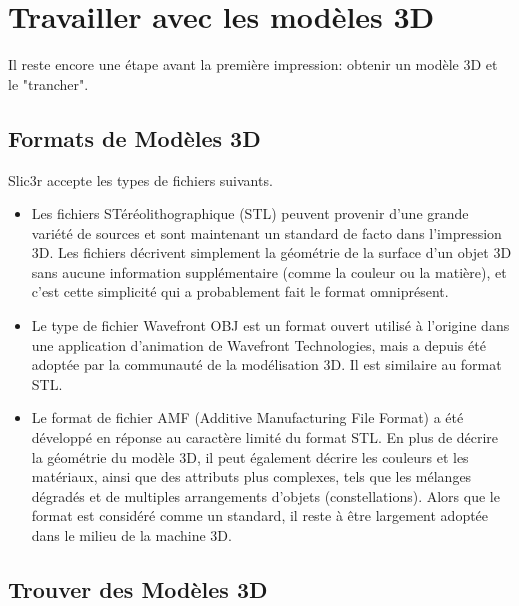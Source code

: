\section{Travailler avec les mod\`eles 3D}
\label{sub:working_with_models}

Il reste encore une \'etape avant la premi\`ere impression: obtenir un mod\`ele 3D et le "trancher".

\subsection{Formats de Mod\`eles 3D} %
\label{sub:model_formats}

Slic3r accepte les types de fichiers suivants.

\begin{itemize}
	\item Les fichiers ST\'er\'eolithographique (STL) peuvent provenir d'une grande vari\'et\'e de sources et sont maintenant un standard de facto dans l'impression 3D. Les fichiers d\'ecrivent simplement la g\'eom\'etrie de la surface d'un objet 3D sans aucune information suppl\'ementaire (comme la couleur ou la mati\`ere), et c'est cette simplicit\'e qui a probablement fait le format omnipr\'esent.
	\item Le type de fichier Wavefront OBJ est un format ouvert utilis\'e \`a l'origine dans une application d'animation de Wavefront Technologies, mais a depuis \'et\'e adopt\'ee par la communaut\'e de la mod\'elisation 3D. Il est similaire au format STL.
	\item Le format de fichier AMF (Additive Manufacturing File Format) a \'et\'e d\'evelopp\'e en r\'eponse au caract\`ere limit\'e du format STL. En plus de d\'ecrire la g\'eom\'etrie du mod\`ele 3D, il peut \'egalement d\'ecrire les couleurs et les mat\'eriaux, ainsi que des attributs plus complexes, tels que les m\'elanges d\'egrad\'es et de multiples arrangements d'objets (constellations). Alors que le format est consid\'er\'e comme un standard, il reste \`a \^etre largement adopt\'ee dans le milieu de la machine 3D.
\end{itemize}

\subsection{Trouver des Mod\`eles 3D} %
\label{sub:finding_models}

